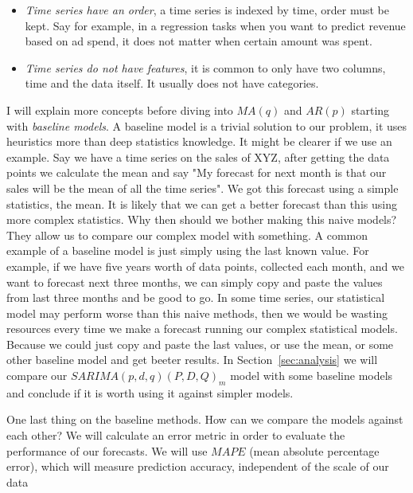 \documentclass[journal]{IEEEtran}
\begin{document}
\begin{itemize}
    \item \emph{Time series have an order}, a time series is indexed by time,
        order must be kept. Say for example, in a regression tasks when  you
        want to predict revenue based on ad spend, it does not matter when
        certain amount was spent.

    \item \emph{Time series do not have features}, it is common to only have
        two columns, time and the data itself. It usually does not have
        categories.
\end{itemize}

I will explain more concepts before diving into $MA(q)$ and $AR(p)$ starting
with \emph{baseline models}. A baseline model is a trivial solution to our
problem, it uses heuristics more than deep statistics knowledge. It might be
clearer if we use an example. Say we have a time series on the sales of XYZ,
after getting the data points we calculate the mean and say "My forecast for
next month is that our sales will be the mean of all the time series". We got
this forecast using a simple statistics, the mean. It is likely that  we can
get a better forecast than this using more complex statistics. Why then should
we bother making this naive models? They allow us to compare our complex model
with something. A common example of a baseline model is just simply using the
last known value. For example, if we have five years worth of data points,
collected each month, and we want to forecast next three months, we can simply
copy and paste the values from last three months and be good to go. In some
time series, our statistical model may perform worse than this naive methods,
then we would be wasting resources every time we make a forecast running our
complex statistical models. Because we could just copy and paste the last
values, or use the mean, or some other baseline model and get beeter results.
In Section~\ref {sec:analysis} we will compare our $SARIMA(p,d,q)(P,D,Q)_m$
model with some baseline models and conclude if it is worth using it against
simpler models.

One last thing on the baseline methods. How can we compare the models against
each other? We will calculate an error metric in order to evaluate the
performance of our forecasts. We will use $MAPE$ (mean absolute percentage
error), which will measure prediction accuracy, independent of the scale of
our data
\end{document}
